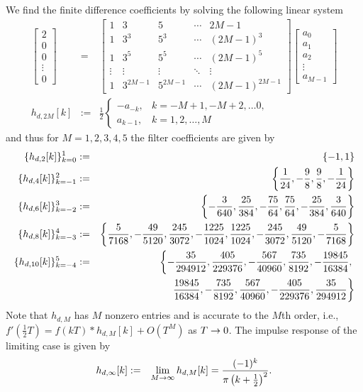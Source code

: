 We find the finite difference coefficients by solving the following linear system
\begin{eqnarray}
\begin{bmatrix} 2 \\ 0 \\ 0 \\ \vdots \\ 0 \end{bmatrix} &=& \begin{bmatrix} 1 & 3 & 5 & \cdots & 2M-1 \\ 1 & 3^3 & 5^3 & \cdots & (2M-1)^3 \\ 1 & 3^5 & 5^5 & \cdots & (2M-1)^5 \\ \vdots & \vdots & \vdots & \ddots & \vdots \\ 1 & 3^{2M-1} & 5^{2M-1} & \cdots & (2M-1)^{2M-1} \end{bmatrix} \begin{bmatrix} a_0 \\ a_1 \\ a_2 \\ \vdots \\ a_{M-1} \end{bmatrix} \label{eq:derivEq1} \\
h_{d,2M}[k] &:=& \frac{1}{2}\begin{cases} -a_{-k}, & k = -M+1, -M+2, \dots 0, \\ a_{k-1}, & k = 1, 2, \dots, M \end{cases} \label{eq:derivEq2}
\end{eqnarray}
and thus for $M = 1, 2, 3, 4, 5$ the filter coefficients are given by
\begin{eqnarray}
\{h_{d,2}[k]\}_{k=0}^1 &:=& \left\{-1, 1\right\} \label{eq:DERIV_FD2} \\
\{h_{d,4}[k]\}_{k=-1}^2 &:=& \left\{\frac{1}{24}, -\frac{9}{8}, \frac{9}{8}, -\frac{1}{24}\right\} \label{eq:DERIV_FD4} \\
\{h_{d,6}[k]\}_{k=-2}^3 &:=& \left\{-\frac{3}{640}, \frac{25}{384}, -\frac{75}{64}, \frac{75}{64}, -\frac{25}{384}, \frac{3}{640}\right\} \label{eq:DERIV_FD6} \\
\{h_{d,8}[k]\}_{k=-3}^4 &:=& \left\{\frac{5}{7168}, -\frac{49}{5120}, \frac{245}{3072}, -\frac{1225}{1024}, \frac{1225}{1024}, -\frac{245}{3072}, \frac{49}{5120}, -\frac{5}{7168}\right\}  \label{eq:DERIV_FD8} \\
\{h_{d,10}[k]\}_{k=-4}^5 &:=& \left\{-\frac{35}{294912}, \frac{405}{229376}, -\frac{567}{40960}, \frac{735}{8192}, -\frac{19845}{16384}, \right. \notag \\ && \left. \quad \; \; \frac{19845}{16384}, -\frac{735}{8192}, \frac{567}{40960}, -\frac{405}{229376}, \frac{35}{294912} \right\} \label{eq:DERIV_FD10}
\end{eqnarray}
Note that $h_{d,M}$ has $M$ nonzero entries and is accurate to the $M$th order, i.e., $f'\left(\frac{1}{2}T\right) = f(kT) * h_{d,M}[k] + O(T^M)$ as $T \rightarrow 0$.  The impulse response of the limiting case is given by
\begin{eqnarray}
h_{d,\infty}[k] &:=& \lim_{M \rightarrow \infty} h_{d,M}[k] = \frac{(-1)^k}{\pi\left(k+\frac{1}{2}\right)^2}.
\end{eqnarray}

